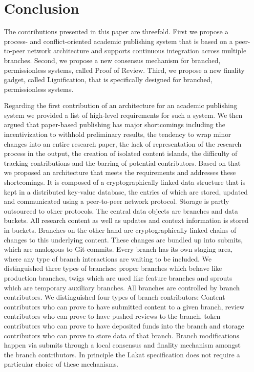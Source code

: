 
\section{Conclusion}
\label{sc:conclusion}

The contributions presented in this paper are threefold. First we propose a process- and conflict-oriented academic publishing system that is based on a peer-to-peer network architecture and supports continuous integration across multiple branches. Second, we propose a new consensus mechanism for branched, permissionless systems, called Proof of Review. Third, we propose a new finality gadget, called Lignification, that is specifically designed for branched, permissionless systems. 

Regarding the first contribution of an architecture for an academic publishing system we provided a list of high-level requirements for such a system. We then argued that paper-based publishing has major shortcomings including the incentivization to withhold preliminary results, the tendency to wrap minor changes into an entire research paper, the lack of representation of the research process in the output, the creation of isolated content islands, the difficulty of tracking contributions and the barring of potential contributors. Based on that we proposed an architecture that meets the requirements and addresses these shortcomings. It is composed of a cryptographically linked data structure that is kept in a distributed key-value database, the entries of which are stored, updated and communicated using a peer-to-peer network protocol. Storage is partly outsourced to other protocols. The central data objects are branches and data buckets. All research content as well as updates and context information is stored in buckets. Branches on the other hand are cryptographically linked chains of changes to this underlying content. These changes are bundled up into submits, which are analogous to Git-commits. Every branch has its own staging area, where any type of branch interactions are waiting to be included. We distinguished three types of branches: proper branches which behave like production branches, twigs which are used like feature branches and sprouts which are temporary auxiliary branches. All branches are controlled by branch contributors. We distinguished four types of branch contributors: Content contributors who can prove to have submitted content to a given branch, review contributors who can prove to have pushed reviews to the branch, token contributors who can prove to have deposited funds into the branch and storage contributors who can prove to store data of that branch. Branch modifications happen via submits through a local consensus and finality mechanism amongst the branch contributors. In principle the Lakat specification does not require a particular choice of these mechanisms.

